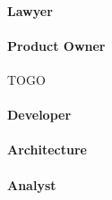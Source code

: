 
\paragraph{Lawyer}\label{par:interview-lawyer}


\paragraph{Product Owner}
TOGO

\paragraph{Developer}\label{par:interview-developer}


\paragraph{Architecture}\label{par:interview-architecture}


\paragraph{Analyst}\label{par:interview-analist}



